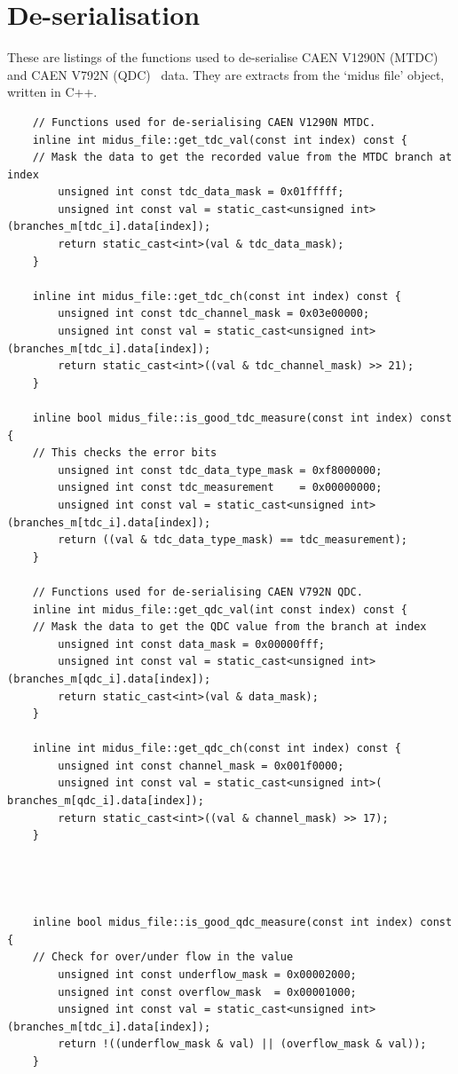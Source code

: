 \documentclass[]{article}
\begin{document}
\section{De-serialisation} %
\label{app:deserialisation}
%
These are listings of the functions used to de-serialise CAEN V1290N (MTDC)~\cite{CAENV1290N} and CAEN V792N (QDC)~\cite{CAENV792N} data. They are extracts from the `midus file' object, written in C++.
%
\begin{verbatim}
    // Functions used for de-serialising CAEN V1290N MTDC.
    inline int midus_file::get_tdc_val(const int index) const {
    // Mask the data to get the recorded value from the MTDC branch at index
        unsigned int const tdc_data_mask = 0x01fffff;
        unsigned int const val = static_cast<unsigned int>(branches_m[tdc_i].data[index]);
        return static_cast<int>(val & tdc_data_mask);
    }
    
    inline int midus_file::get_tdc_ch(const int index) const {
        unsigned int const tdc_channel_mask = 0x03e00000;
        unsigned int const val = static_cast<unsigned int>(branches_m[tdc_i].data[index]);
        return static_cast<int>((val & tdc_channel_mask) >> 21);
    }
    
    inline bool midus_file::is_good_tdc_measure(const int index) const {
    // This checks the error bits
        unsigned int const tdc_data_type_mask = 0xf8000000;
        unsigned int const tdc_measurement    = 0x00000000;
        unsigned int const val = static_cast<unsigned int>(branches_m[tdc_i].data[index]);
        return ((val & tdc_data_type_mask) == tdc_measurement);
    }
    
    // Functions used for de-serialising CAEN V792N QDC.
    inline int midus_file::get_qdc_val(int const index) const {
    // Mask the data to get the QDC value from the branch at index
        unsigned int const data_mask = 0x00000fff;
        unsigned int const val = static_cast<unsigned int>(branches_m[qdc_i].data[index]);
        return static_cast<int>(val & data_mask); 
    }
    
    inline int midus_file::get_qdc_ch(const int index) const {
        unsigned int const channel_mask = 0x001f0000;
        unsigned int const val = static_cast<unsigned int>( branches_m[qdc_i].data[index]);
        return static_cast<int>((val & channel_mask) >> 17);
    }
    
    
    
    
    inline bool midus_file::is_good_qdc_measure(const int index) const {
    // Check for over/under flow in the value
        unsigned int const underflow_mask = 0x00002000;
        unsigned int const overflow_mask  = 0x00001000;
        unsigned int const val = static_cast<unsigned int>(branches_m[tdc_i].data[index]);
        return !((underflow_mask & val) || (overflow_mask & val));
    }
\end{verbatim}
\end{document}
